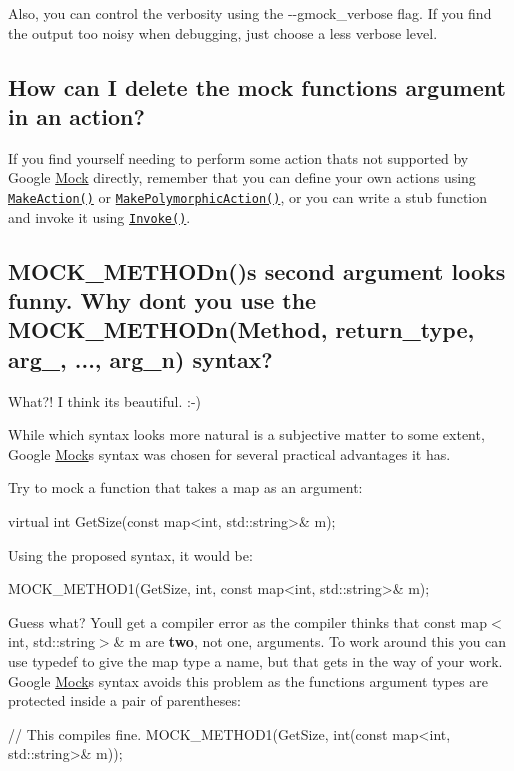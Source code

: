 Also, you can control the verbosity using the {\ttfamily -\/-\/gmock\+\_\+verbose} flag. If you find the output too noisy when debugging, just choose a less verbose level.

\subsection*{How can I delete the mock function\textquotesingle{}s argument in an action?}

If you find yourself needing to perform some action that\textquotesingle{}s not supported by Google \hyperlink{class_mock}{Mock} directly, remember that you can define your own actions using \href{http://code.google.com/p/googlemock/wiki/V1_6_CookBook#Writing_New_Actions}{\tt Make\+Action()} or \href{http://code.google.com/p/googlemock/wiki/V1_6_CookBook#Writing_New_Polymorphic_Actions}{\tt Make\+Polymorphic\+Action()}, or you can write a stub function and invoke it using \href{http://code.google.com/p/googlemock/wiki/V1_6_CookBook#Using_Functions_Methods_Functors}{\tt Invoke()}.

\subsection*{M\+O\+C\+K\+\_\+\+M\+E\+T\+H\+O\+Dn()\textquotesingle{}s second argument looks funny. Why don\textquotesingle{}t you use the M\+O\+C\+K\+\_\+\+M\+E\+T\+H\+O\+Dn(Method, return\+\_\+type, arg\+\_, ..., arg\+\_\+n) syntax?}

What?! I think it\textquotesingle{}s beautiful. \+:-\/)

While which syntax looks more natural is a subjective matter to some extent, Google \hyperlink{class_mock}{Mock}\textquotesingle{}s syntax was chosen for several practical advantages it has.

Try to mock a function that takes a map as an argument\+: 
\begin{DoxyCode}
virtual int GetSize(const map<int, std::string>& m);
\end{DoxyCode}


Using the proposed syntax, it would be\+: 
\begin{DoxyCode}
MOCK\_METHOD1(GetSize, int, const map<int, std::string>& m);
\end{DoxyCode}


Guess what? You\textquotesingle{}ll get a compiler error as the compiler thinks that {\ttfamily const map$<$int, std\+::string$>$\& m} are {\bfseries two}, not one, arguments. To work around this you can use {\ttfamily typedef} to give the map type a name, but that gets in the way of your work. Google \hyperlink{class_mock}{Mock}\textquotesingle{}s syntax avoids this problem as the function\textquotesingle{}s argument types are protected inside a pair of parentheses\+: 
\begin{DoxyCode}
// This compiles fine.
MOCK\_METHOD1(GetSize, int(const map<int, std::string>& m));
\end{DoxyCode}


